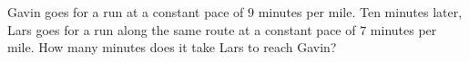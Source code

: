 Gavin goes for a run at a constant pace of $9$ minutes per mile. Ten minutes later, Lars goes for a run along the same route at a constant pace of $7$ minutes per mile. How many minutes does it take Lars to reach Gavin?
